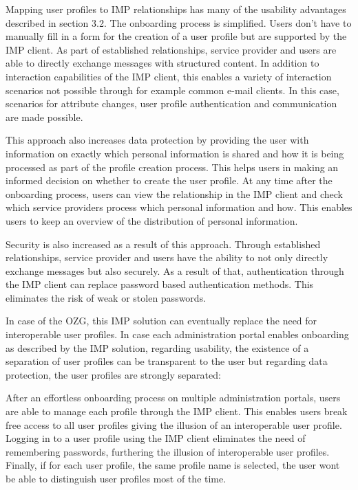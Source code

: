 Mapping user profiles to IMP relationships has many of the usability advantages described in section 3.2. The onboarding process is simplified. Users don't have to manually fill in a form for the creation of a user profile but are supported by the IMP client. As part of established relationships, service provider and users are able to directly exchange messages with structured content. In addition to interaction capabilities of the IMP client, this enables a variety of interaction scenarios not possible through for example common e-mail clients. In this case, scenarios for attribute changes, user profile authentication and communication are made possible.

This approach also increases data protection by providing the user with information on exactly which personal information is shared and how it is being processed as part of the profile creation process. This helps users in making an informed decision on whether to create the user profile. At any time after the onboarding process, users can view the relationship in the IMP client and check which service providers process which personal information and how. This enables users to keep an overview of the distribution of personal information.

Security is also increased as a result of this approach. Through established relationships, service provider and users have the ability to not only directly exchange messages but also securely. As a result of that, authentication through the IMP client can replace password based authentication methods. This eliminates the risk of weak or stolen passwords.

In case of the OZG, this IMP solution can eventually replace the need for interoperable user profiles. In case each administration portal enables onboarding as described by the IMP solution, regarding usability, the existence of a separation of user profiles can be transparent to the user but regarding data protection, the user profiles are strongly separated:

After an effortless onboarding process on multiple administration portals, users are able to manage each profile through the IMP client. This enables users break free access to all user profiles giving the illusion of an interoperable user profile. Logging in to a user profile using the IMP client eliminates the need of remembering passwords, furthering the illusion of interoperable user profiles. Finally, if for each user profile, the same profile name is selected, the user wont be able to distinguish user profiles most of the time.


